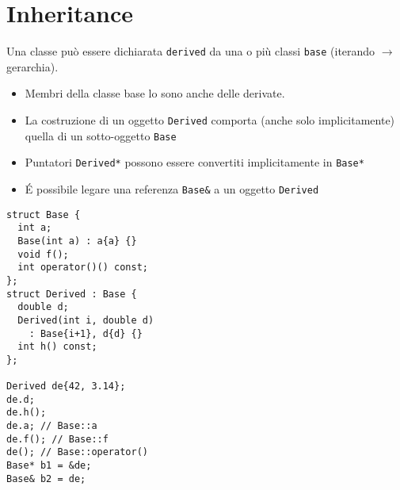 \documentclass[10pt, oneside]{Book}
\begin{document}
\section{Inheritance}
Una classe può essere dichiarata \texttt{derived} da una o più classi \texttt{base} (iterando $\rightarrow$ gerarchia).
\begin{itemize}
\item Membri della classe base lo sono anche delle derivate. 
\item La costruzione di un oggetto \texttt{Derived} comporta (anche solo implicitamente) quella di un sotto-oggetto \texttt{Base}
\item Puntatori \texttt{Derived*} possono essere convertiti implicitamente in \texttt{Base*}
\item \'E possibile legare una referenza \texttt{Base\&} a un oggetto \texttt{Derived}
\end{itemize}
\begin{verbatim}
struct Base {
  int a;
  Base(int a) : a{a} {}
  void f();
  int operator()() const;
};
struct Derived : Base {
  double d;
  Derived(int i, double d)
    : Base{i+1}, d{d} {}
  int h() const;
};

Derived de{42, 3.14};
de.d;
de.h();
de.a; // Base::a
de.f(); // Base::f
de(); // Base::operator()
Base* b1 = &de;
Base& b2 = de;
\end{verbatim}
\end{document}
